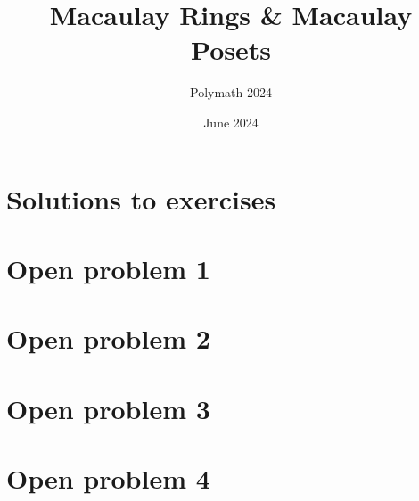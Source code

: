 \documentclass[11pt]{amsart}
\title{Macaulay Rings \& Macaulay Posets}
\author{Polymath 2024}
\date{June 2024}
\theoremstyle{plain} %
\theoremstyle{definition}
\theoremstyle{remark}
\numberwithin{equation}{section}  %
\begin{document}
\maketitle
\tableofcontents

\section{Solutions to exercises}



\section{Open problem 1}

\section{Open problem 2}

\section{Open problem 3}

\section{Open problem 4}
\end{document}
